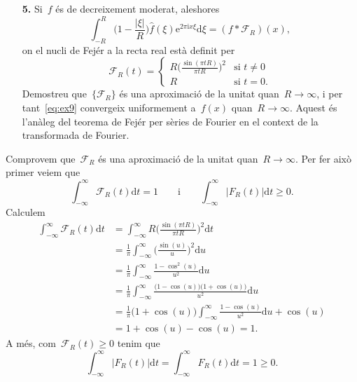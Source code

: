 \documentclass[a4paper]{article}
\theoremstyle{definition}
\newcommand{\iu}{\mathrm{i}}
\newcommand{\e}{\mathrm{e}}
\newcommand{\uppi}{\pi}
\newcommand{\diff}{\mathrm{d}}
\newcommand{\abs}[1]{\lvert{#1}\rvert}
\newcommand{\F}{\mathcal{F}}
\newcommand{\conv}{\mathop{\ast}}
\begin{document}
\begin{enumerate}
    \item[\textbf{5.}] Si~\(f\) és de decreixement moderat, aleshores
        \begin{equation}
            \label{eq:ex9}
            \int_{-R}^{R}\biggl(1 - \frac{\abs{\xi}}{R}\biggr)
            \widehat{f}(\xi)\e^{2\uppi\iu x\xi}\diff\xi
            = (f\conv\F_{R})(x),
        \end{equation}
        on el nucli de Fejér a la recta real està definit per
        \[
            \F_{R}(t) = \begin{cases}\displaystyle
                R\biggl(\frac{\sin(\uppi tR)}{\uppi tR}\biggr)^{2}
                & \text{si } t \neq 0 \\
                R & \text{si } t = 0.
            \end{cases}
        \]
        Demostreu que~\(\{\F_{R}\}\) és una aproximació de la unitat
        quan~\(R\to\infty\), i per tant~\ref{eq:ex9} convergeix uniformement
        a~\(f(x)\) quan~\(R\to\infty\).
        Aquest és l'anàleg del teorema de Fejér per sèries de Fourier en el
        context de la transformada de Fourier.
\end{enumerate}

Comprovem que~\(\F_{R}\) és una aproximació de la unitat quan~\(R\to\infty\).
Per fer això primer veiem que
\[
    \int_{-\infty}^{\infty} \F_{R}(t) \diff t = 1
    \qquad\text{i}\qquad
    \int_{-\infty}^{\infty} \abs{F_{R}(t)} \diff t \geq 0.
\]
Calculem
\begin{align*}
    \int_{-\infty}^{\infty} \F_{R}(t)\diff t
        &= \int_{-\infty}^{\infty}
           R\biggl(\frac{\sin(\uppi tR)}{\uppi tR}\biggr)^{2}
           \diff t \\
        &= \frac{1}{\uppi}
           \int_{-\infty}^{\infty}
           \biggl(\frac{\sin(u)}{u}\biggr)^{2}
           \diff u \\
        &= \frac{1}{\uppi}
           \int_{-\infty}^{\infty}
           \frac{1-\cos^{2}(u)}{u^{2}}
           \diff u \\
        &= \frac{1}{\uppi}
           \int_{-\infty}^{\infty}
           \frac{\bigl(1-\cos(u)\bigr)\bigl(1+\cos(u)\bigr)}{u^{2}}
           \diff u \\
        &= \frac{1}{\uppi}
           \bigl(1+\cos(u)\bigr)
           \int_{-\infty}^{\infty}
           \frac{1-\cos(u)}{u^{2}}
           \diff u
           +
           \cos(u) \\
        &= 1 + \cos(u) - \cos(u) = 1.
\end{align*}
A més, com~\(\F_{R}(t) \geq 0\) tenim que
\[
    \int_{-\infty}^{\infty} \abs{F_{R}(t)} \diff t
    = \int_{-\infty}^{\infty} F_{R}(t) \diff t
    = 1 \geq 0.
\]
\end{document}
